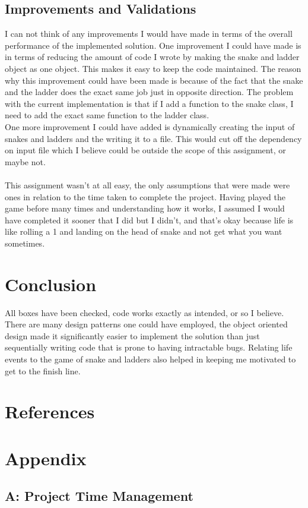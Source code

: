 \subsection*{Improvements and Validations}
I can not think of any improvements I would have made in terms of the overall performance of the implemented solution. One improvement I could have made is in terms of reducing the amount of code I wrote by making the snake and ladder object as one object. This makes it easy to keep the code maintained. The reason why this improvement could have been made is because of the fact that the snake and the ladder does the exact same job just in opposite direction. The problem with the current implementation is that if I add a function to the snake class, I need to add the exact same function to the ladder class.\\
One more improvement I could have added is dynamically creating the input of snakes and ladders and the writing it to a file. This would cut off the dependency on input file which I believe could be outside the scope of this assignment, or maybe not. \\ \\
This assignment wasn't at all easy, the only assumptions that were made were ones in relation to the time taken to complete the project. Having played the game before many times and understanding how it works, I assumed I would have completed it sooner that I did but I didn't, and that's okay because life is like rolling a 1 and landing on the head of snake and not get what you want sometimes. 

\section*{Conclusion}
All boxes have been checked, code works exactly as intended, or so I believe. There are many design patterns one could have employed, the object oriented design made it significantly easier to implement the solution than just sequentially writing code that is prone to having intractable bugs. Relating life events to the game of snake and ladders also helped in keeping me motivated to get to the finish line.

\newpage
\section*{References}


\newpage
\section*{Appendix}
\subsection*{A: Project Time Management}


 

